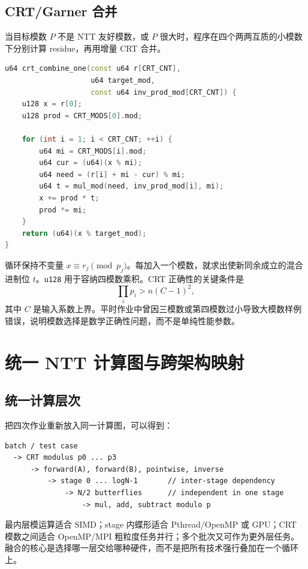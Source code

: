 \subsection{CRT/Garner 合并}

当目标模数 $P$ 不是 NTT 友好模数，或 $P$ 很大时，程序在四个两两互质的小模数下分别计算 residue，再用增量 CRT 合并。

\begin{lstlisting}[title=增量 CRT 合并一个输出系数,label={lst:crt-combine},language={C++}]
u64 crt_combine_one(const u64 r[CRT_CNT],
                    u64 target_mod,
                    const u64 inv_prod_mod[CRT_CNT]) {
    u128 x = r[0];
    u128 prod = CRT_MODS[0].mod;

    for (int i = 1; i < CRT_CNT; ++i) {
        u64 mi = CRT_MODS[i].mod;
        u64 cur = (u64)(x % mi);
        u64 need = (r[i] + mi - cur) % mi;
        u64 t = mul_mod(need, inv_prod_mod[i], mi);
        x += prod * t;
        prod *= mi;
    }
    return (u64)(x % target_mod);
}
\end{lstlisting}

循环保持不变量 $x\equiv r_j\pmod{p_j}$。每加入一个模数，就求出使新同余成立的混合进制位 $t$。\texttt{u128} 用于容纳四模数乘积。CRT 正确性的关键条件是
\[
\prod_i p_i > n(C-1)^2,
\]
其中 $C$ 是输入系数上界。平时作业中曾因三模数或第四模数过小导致大模数样例错误，说明模数选择是数学正确性问题，而不是单纯性能参数。

\section{统一 NTT 计算图与跨架构映射}\newwork

\subsection{统一计算层次}

把四次作业重新放入同一计算图，可以得到：

\begin{lstlisting}[title=NTT卷积的统一计算层次]
batch / test case
  -> CRT modulus p0 ... p3
      -> forward(A), forward(B), pointwise, inverse
          -> stage 0 ... logN-1       // inter-stage dependency
              -> N/2 butterflies      // independent in one stage
                  -> mul, add, subtract modulo p
\end{lstlisting}

最内层模运算适合 SIMD；stage 内蝶形适合 Pthread/OpenMP 或 GPU；CRT 模数之间适合 OpenMP/MPI 粗粒度任务并行；多个批次又可作为更外层任务。融合的核心是选择哪一层交给哪种硬件，而不是把所有技术强行叠加在一个循环上。

